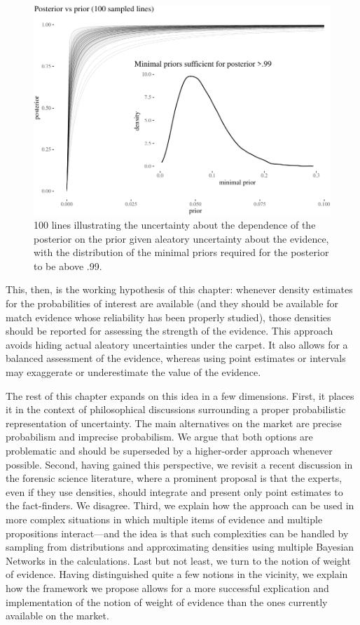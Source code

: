 \documentclass[
  10pt,
  dvipsnames,enabledeprecatedfontcommands]{scrartcl}
\begin{document}
\begin{figure}[H]

\begin{center}\includegraphics[width=0.8\linewidth]{chapter-outline_files/figure-latex/fig:lines3-1} \end{center}

\caption{100 lines illustrating the uncertainty about the dependence of the posterior on the prior given aleatory uncertainty about the evidence, with the distribution of the minimal priors required for the posterior to be above .99.}

\label{fig:lines}

\end{figure}

This, then, is the working hypothesis of this chapter: whenever density
estimates for the probabilities of interest are available (and they
should be available for match evidence whose reliability has been
properly studied), those densities should be reported for assessing the
strength of the evidence. This approach avoids hiding actual aleatory
uncertainties under the carpet. It also allows for a balanced assessment
of the evidence, whereas using point estimates or intervals may
exaggerate or underestimate the value of the evidence.

The rest of this chapter expands on this idea in a few dimensions.
First, it places it in the context of philosophical discussions
surrounding a proper probabilistic representation of uncertainty. The
main alternatives on the market are precise probabilism and imprecise
probabilism. We argue that both options are problematic and should be
superseded by a higher-order approach whenever possible. Second, having
gained this perspective, we revisit a recent discussion in the forensic
science literature, where a prominent proposal is that the experts, even
if they use densities, should integrate and present only point estimates
to the fact-finders. We disagree. Third, we explain how the approach can
be used in more complex situations in which multiple items of evidence
and multiple propositions interact---and the idea is that such
complexities can be handled by sampling from distributions and
approximating densities using multiple Bayesian Networks in the
calculations. Last but not least, we turn to the notion of weight of
evidence. Having distinguished quite a few notions in the vicinity, we
explain how the framework we propose allows for a more successful
explication and implementation of the notion of weight of evidence than
the ones currently available on the market.
\end{document}

